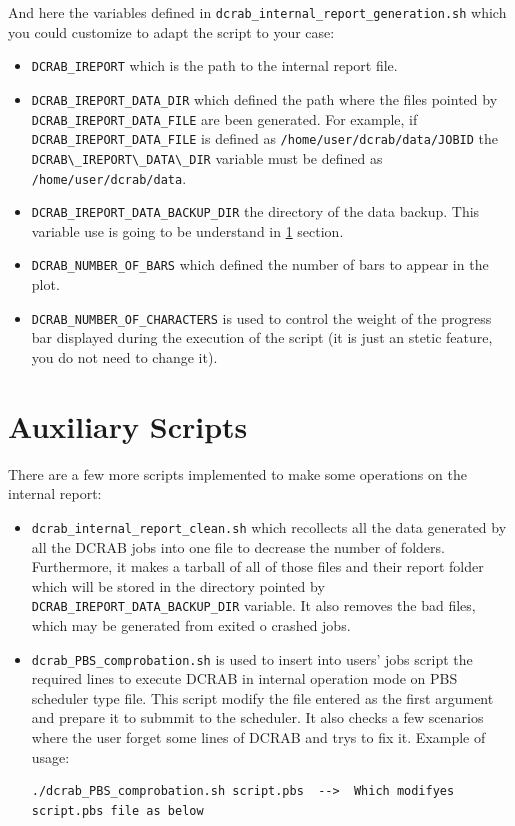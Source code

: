 \documentclass[10pt,a4paper]{report}
\begin{document}
And here the variables defined in \verb+dcrab_internal_report_generation.sh+ which you could customize to adapt the script to your case:

\begin{itemize}
  \item \texttt{DCRAB\_IREPORT} which is the path to the internal report file.
  \item \texttt{DCRAB\_IREPORT\_DATA\_DIR} which defined the path where the files pointed by \verb+DCRAB_IREPORT_DATA_FILE+ are been generated. For example, if \verb+DCRAB_IREPORT_DATA_FILE+ is defined as \verb+/home/user/dcrab/data/JOBID+ the \verb+DCRAB\_IREPORT\_DATA\_DIR+ variable must be defined as \verb+/home/user/dcrab/data+.
  \item \texttt{DCRAB\_IREPORT\_DATA\_BACKUP\_DIR} the directory of the data backup. This variable use is going to be understand in \ref{intReportAuxScripts} section.
  \item \texttt{DCRAB\_NUMBER\_OF\_BARS} which defined the number of bars to appear in the plot.
  \item \texttt{DCRAB\_NUMBER\_OF\_CHARACTERS} is used to control the weight of the progress bar displayed during the execution of the script (it is just an stetic feature, you do not need to change it).
\end{itemize}

\section{Auxiliary Scripts}
\label{intReportAuxScripts}

There are a few more scripts implemented to make some operations on the internal report:

\begin{itemize}
  \item \verb+dcrab_internal_report_clean.sh+ which recollects all the data generated by all the DCRAB jobs into one file to decrease the number of folders. Furthermore, it makes a tarball of all of those files and their report folder which will be stored in the directory pointed by \texttt{DCRAB\_IREPORT\_DATA\_BACKUP\_DIR} variable. It also removes the bad files, which may be generated from exited o crashed jobs.
  \item \verb+dcrab_PBS_comprobation.sh+ is used to insert into users' jobs script the required lines to execute DCRAB in internal operation mode on PBS scheduler type file. This script modify the file entered as the first argument and prepare it to submmit to the scheduler. It also checks a few scenarios where the user forget some lines of DCRAB and trys to fix it. Example of usage:

\begin{verbatim}
./dcrab_PBS_comprobation.sh script.pbs  -->  Which modifyes script.pbs file as below
\end{verbatim}
\end{itemize}
\end{document}

